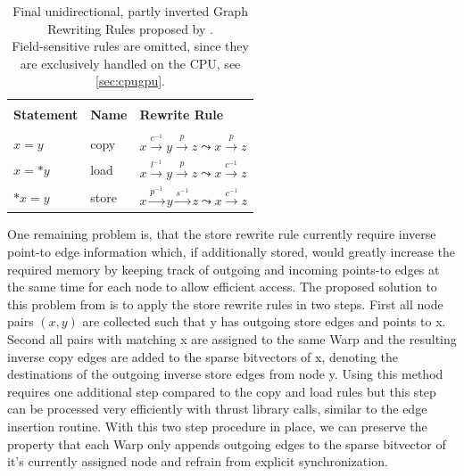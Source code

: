 \begin{table}
    \begin{center}
        \begin{tabular}{l|l|l}
            \hline                                                                                                                             \\
            \textbf{Statement} & \textbf{Name} & \textbf{Rewrite Rule}                                                                         \\
            \hline                                                                                                                             \\
            $x = y$            & copy          & $x \xrightarrow{c^{-1}} y \xrightarrow{p} z \mathrel{\leadsto} x \xrightarrow{p} z$           \\
            $x = *y$           & load          & $x \xrightarrow{l^{-1}} y \xrightarrow{p} z \mathrel{\leadsto} x \xrightarrow{c^{-1}} z$      \\
            $*x = y$           & store         & $x \xrightarrow{p^{-1}} y \xrightarrow{s^{-1}} z \mathrel{\leadsto} x \xrightarrow{c^{-1}} z$ \\
        \end{tabular}
    \end{center}
    \caption[List of Graph Rewriting Rules in use by PTAGPU]{Final unidirectional, partly inverted Graph Rewriting Rules proposed by \cite{mendez2012gpu}.\\Field-sensitive rules are omitted, since they are exclusively handled on the CPU, see \autoref{sec:cpugpu}.}
    \label{tab:rewrite-rules}
\end{table}
One remaining problem is, that the store rewrite rule currently require inverse point-to edge information which, if additionally stored, would greatly increase the required memory by keeping track of outgoing and incoming points-to edges at the same time for each node to allow efficient access.
The proposed solution to this problem from \cite{mendez2012gpu} is to apply the store rewrite rules in two steps. First all node pairs $(x,y)$ are collected such that y has outgoing store edges and points to x. Second all pairs with matching x are assigned to the same Warp and the resulting inverse copy edges are added to the sparse bitvectors of x, denoting the destinations of the outgoing inverse store edges from node y.
Using this method requires one additional step compared to the copy and load rules but this step can be processed very efficiently with thrust library calls, similar to the edge insertion routine.
With this two step procedure in place, we can preserve the property that each Warp only appends outgoing edges to the sparse bitvector of it's currently assigned node and refrain from explicit synchronization.
